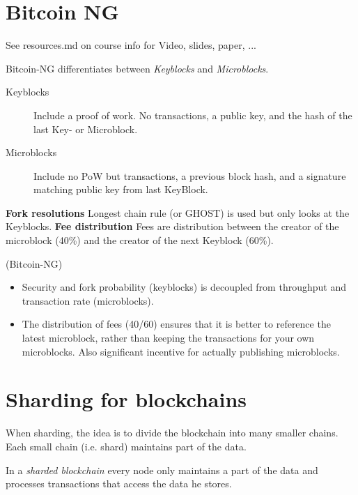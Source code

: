 \section{Bitcoin NG}
See resources.md on course info for Video, slides, paper, ...

\begin{definition} Bitcoin-NG differentiates between \emph{Keyblocks} and \emph{Microblocks}. 
	\begin{description}
		\item[Keyblocks] Include a proof of work. No transactions, a public key, and the hash of the last Key- or Microblock.
		\item[Microblocks] Include no PoW but transactions, a previous block hash, and a signature matching public key from last KeyBlock.
	\end{description}

	\noindent
	\textbf{Fork resolutions} Longest chain rule (or GHOST) is used but only looks at the Keyblocks.
	\textbf{Fee distribution} Fees are distribution between the creator of the microblock (40\%) and the creator of the next Keyblock (60\%).
\end{definition}

\begin{note} 
	(Bitcoin-NG)\newline
	
	
	\begin{itemize}
		\item Security and fork probability (keyblocks) is decoupled from throughput and transaction rate (microblocks).
		\item The distribution of fees (40/60) ensures that it is better to reference the latest microblock, rather than keeping the transactions for your own microblocks. Also significant incentive for actually publishing microblocks.
	\end{itemize}


\end{note}

\section{Sharding for blockchains}
When sharding, the idea is to divide the blockchain into many smaller chains. Each small chain (i.e. shard) maintains part of the data.

\begin{definition} In a \emph{sharded blockchain} every node only maintains a part of the data and processes transactions that access the data he stores.
\end{definition}

